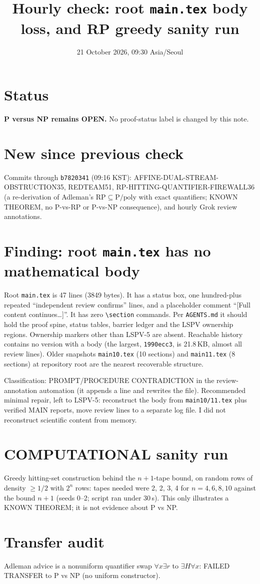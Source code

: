 \documentclass[11pt]{article}
\title{Hourly check: root \texttt{main.tex} body loss, and RP greedy sanity run}
\date{21 October 2026, 09:30 Asia/Seoul}
\begin{document}
\maketitle
\section*{Status}
\textbf{P versus NP remains OPEN.} No proof-status label is changed by this note.

\section*{New since previous check}
Commits through \texttt{b7820341} (09:16 KST): AFFINE-DUAL-STREAM-OBSTRUCTION35,
REDTEAM51, RP-HITTING-QUANTIFIER-FIREWALL36 (a re-derivation of Adleman's
$\mathrm{RP}\subseteq\mathrm{P/poly}$ with exact quantifiers; KNOWN THEOREM,
no P-vs-RP or P-vs-NP consequence), and hourly Grok review annotations.

\section*{Finding: root \texttt{main.tex} has no mathematical body}
Root \texttt{main.tex} is 47 lines (3849 bytes). It has a status box, one
hundred-plus repeated ``independent review confirms'' lines, and a placeholder
comment ``[Full content continues\ldots]''. It has zero \verb|\section| commands.
Per \texttt{AGENTS.md} it should hold the proof spine, status tables, barrier
ledger and the LSPV ownership regions. Ownership markers other than
LSPV-5 are absent. Reachable history contains no version with a body
(the largest, \texttt{1990ecc3}, is 21.8\,KB, almost all review lines).
Older snapshots \texttt{main10.tex} (10 sections) and \texttt{main11.tex}
(8 sections) at repository root are the nearest recoverable structure.

Classification: PROMPT/PROCEDURE CONTRADICTION in the review-annotation
automation (it appends a line and rewrites the file). Recommended minimal
repair, left to LSPV-5: reconstruct the body from \texttt{main10/11.tex}
plus verified MAIN reports, move review lines to a separate log file.
I did not reconstruct scientific content from memory.

\section*{COMPUTATIONAL sanity run}
Greedy hitting-set construction behind the $n+1$-tape bound, on random rows of
density $\ge 1/2$ with $2^n$ rows: tapes needed were 2, 2, 3, 4 for
$n=4,6,8,10$ against the bound $n+1$ (seeds 0--2; script ran under 30\,s).
This only illustrates a KNOWN THEOREM; it is not evidence about P vs NP.

\section*{Transfer audit}
Adleman advice is a nonuniform quantifier swap $\forall x\exists r$ to
$\exists H\forall x$: FAILED TRANSFER to P vs NP (no uniform constructor).
\end{document}

